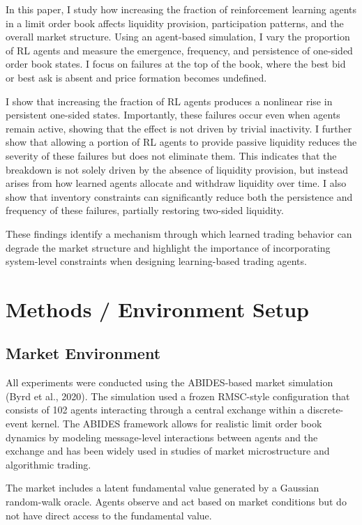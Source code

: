 \documentclass[sigconf]{acmart}
\begin{document}
In this paper, I study how increasing the fraction of reinforcement learning agents in a limit order book affects liquidity provision, participation patterns, and the overall market structure. Using an agent-based simulation, I vary the proportion of RL agents and measure the emergence, frequency, and persistence of one-sided order book states. I focus on failures at the top of the book, where the best bid or best ask is absent and price formation becomes undefined.

I show that increasing the fraction of RL agents produces a nonlinear rise in persistent one-sided states. Importantly, these failures occur even when agents remain active, showing that the effect is not driven by trivial inactivity. I further show that allowing a portion of RL agents to provide passive liquidity reduces the severity of these failures but does not eliminate them. This indicates that the breakdown is not solely driven by the absence of liquidity provision, but instead arises from how learned agents allocate and withdraw liquidity over time. I also show that inventory constraints can significantly reduce both the persistence and frequency of these failures, partially restoring two-sided liquidity.

These findings identify a mechanism through which learned trading behavior can degrade the market structure and highlight the importance of incorporating system-level constraints when designing learning-based trading agents.

\section{Methods / Environment Setup}

\subsection{Market Environment}

All experiments were conducted using the ABIDES-based market simulation (Byrd et al., 2020). The simulation used a frozen RMSC-style configuration that consists of 102 agents interacting through a central exchange within a discrete-event kernel. The ABIDES framework allows for realistic limit order book dynamics by modeling message-level interactions between agents and the exchange and has been widely used in studies of market microstructure and algorithmic trading.

The market includes a latent fundamental value generated by a Gaussian random-walk oracle. Agents observe and act based on market conditions but do not have direct access to the fundamental value.
\end{document}
